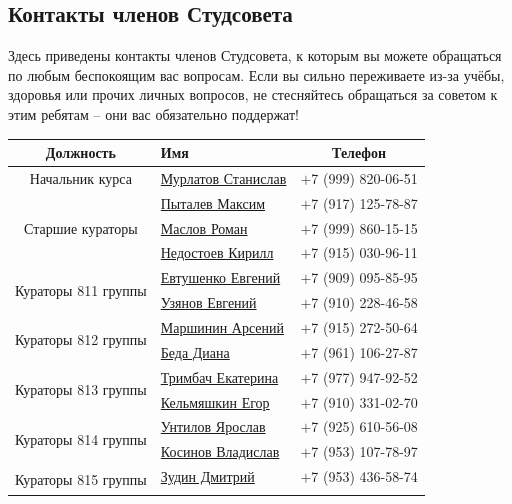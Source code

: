 \documentclass[14pt]{extarticle}
\begin{document}
\subsection{Контакты членов Студсовета}
{
\small
Здесь приведены контакты членов Студсовета,
к которым вы можете обращаться по любым беспокоящим вас
вопросам. Если вы сильно переживаете из-за учёбы, здоровья
или прочих личных вопросов, не стесняйтесь обращаться за
советом к этим ребятам -- они вас обязательно поддержат!
}
\begin{center}
\small
\renewcommand{\arraystretch}{1.1}
\begin{tabular}{ |c|l|c| }
\hline
\textbf{Должность} & \textbf{Имя} & \textbf{Телефон} \\ \hline
Начальник курса & \href{https://vk.com/id66638178}{Мурлатов Станислав} & $+$7 (999) 820-06-51 \\ \hline
\multirow{3}{*}{Старшие кураторы}
& \href{https://vk.com/maximpytalev}{Пыталев Максим} & $+$7 (917) 125-78-87 \\ \cline{2-3}
& \href{https://vk.com/id45627177}{Маслов Роман} & $+$7 (999) 860-15-15 \\ \cline{2-3}
& \href{https://vk.com/inedostoev}{Недостоев Кирилл} & $+$7 (915) 030-96-11 \\ \hline \hline
\multirow{2}{*}{Кураторы 811 группы}
& \href{https://vk.com/id137691527}{Евтушенко Евгений} & $+$7 (909) 095-85-95 \\ \cline{2-3}
& \href{https://vk.com/id180303567}{Узянов Евгений} & $+$7 (910) 228-46-58 \\ \hline
\multirow{2}{*}{Кураторы 812 группы}
& \href{https://vk.com/id436005639}{Маршинин Арсений} & $+$7 (915) 272-50-64 \\ \cline{2-3}
& \href{https://vk.com/id95266426}{Беда Диана} & $+$7 (961) 106-27-87 \\ \hline
\multirow{2}{*}{Кураторы 813 группы}
& \href{https://vk.com/id156887848}{Тримбач Екатерина} & $+$7 (977) 947-92-52 \\ \cline{2-3}
& \href{https://vk.com/id236114377}{Кельмяшкин Егор} & $+$7 (910) 331-02-70 \\ \hline
\multirow{2}{*}{Кураторы 814 группы}
& \href{https://vk.com/id180165321}{Унтилов Ярослав} & $+$7 (925) 610-56-08 \\ \cline{2-3}
& \href{https://vk.com/id223851324}{Косинов Владислав} & $+$7 (953) 107-78-97 \\ \hline
\multirow{2}{*}{Кураторы 815 группы}
& \href{https://vk.com/id71260083}{Зудин Дмитрий} & $+$7 (953) 436-58-74 \\ \cline{2-3}

\end{tabular}
\end{center}
\end{document}
